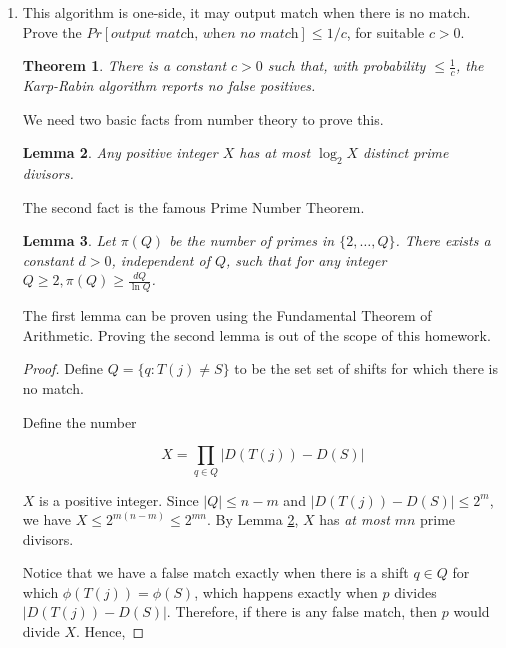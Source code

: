 \documentclass[12pt, a4paper]{article} %
\newtheorem{theorem}{Theorem}[section]     %
\newtheorem{lemma}[theorem]{Lemma}
\begin{document}
\begin{enumerate}[label=(\alph*)]
  \item This algorithm is one-side, it may output match when there is no match. Prove the $Pr[\textit{output match, when no match}] \leq 1/c$, for suitable $c > 0$.

    \begin{theorem}
      There is a constant $c > 0$ such that, with probability $\leq \frac{1}{c}$, the \textit{Karp-Rabin algorithm} reports no false positives.
    \end{theorem}

    We need two basic facts from number theory to prove this.

    \begin{lemma}\label{lemma:1}
      Any positive integer $X$ has at most $\log_{2}X$ \textit{distinct prime divisors}.
    \end{lemma}

    The second fact is the famous Prime Number Theorem.

    \begin{lemma}\label{lemma:2}
      Let $\pi(Q)$ be the number of primes in $\{2, \ldots, Q\}$. There exists a constant $d > 0$, independent of $Q$, such that for any integer $Q \geq 2, \pi(Q) \geq \frac{d Q}{\ln Q}$.
    \end{lemma}

    The first lemma can be proven using the Fundamental Theorem of Arithmetic.
    Proving the second lemma is out of the scope of this homework.


    \begin{proof}

      Define $Q = \{q : T(j) \neq S\}$ to be the set set of shifts for which there is no match.

      Define the number

      \begin{equation}\label{eq:4}
        X = \prod_{q \in Q} |D(T(j)) - D(S)|
      \end{equation}

      $X$ is a positive integer. Since $|Q| \leq n - m$ and $|D(T(j)) - D(S)| \leq 2^{m}$, we have $X \leq 2^{m(n - m)} \leq 2^{mn}$. By Lemma \ref{lemma:1}, $X$ has \textit{at most} $mn$ prime divisors.

        Notice that we have a false match exactly when there is a shift $q \in Q$ for which $\phi(T(j)) = \phi(S)$, which happens exactly when $p$ divides $|D(T(j)) - D(S)|$. Therefore, if there is any false match, then $p$ would divide $X$. Hence,


\end{proof}
\end{enumerate}
\end{document}
